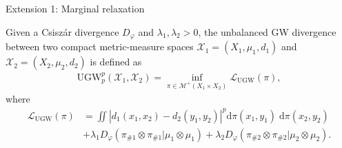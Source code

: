 \documentclass{beamer}
\newcommand{\ugw}{\text{UGW}}
\newcommand{\cX}{\mathcal X}
\newcommand{\cM}{\mathcal M}
\newcommand{\cL}{\mathcal L}
\newcommand{\rmd}{\mathrm{d}}
\begin{document}
\begin{frame}{Extension 1: Marginal relaxation}
  \vspace{-0.5cm}
  \scriptsize
  \begin{definition}
    Given a Csiszár divergence $D_{\varphi}$ and $\lambda_1, \lambda_2 > 0$,
    the unbalanced GW divergence between two compact metric-measure spaces
    $\cX_1 = (X_1, \mu_1, d_1)$ and $\cX_2 = (X_2, \mu_2, d_2)$ is defined as
    \begin{align*}
      \ugw_p^p(\cX_1, \cX_2) = \inf_{\pi \in \cM^+(X_1 \times X_2)} \cL_{\ugw}(\pi),
    \end{align*}
    \vspace{-0.3cm}
    where
    \vspace{-0.5cm}
    \begin{align*}
      \cL_{\ugw}(\pi) &= \iint \left| d_1(x_1, x_2) - d_2(y_1, y_2) \right|^p
      \rmd\pi(x_1, y_1) \; \rmd\pi(x_2, y_2) \\
      &+ \lambda_1 D_{\varphi}(\pi_{\# 1} \otimes \pi_{\# 1} | \mu_1 \otimes \mu_1)
      + \lambda_2 D_{\varphi}(\pi_{\# 2} \otimes \pi_{\# 2} | \mu_2 \otimes \mu_2).
    \end{align*}
  \end{definition}

  \vspace{-0.5cm}


\end{frame}
\end{document}
